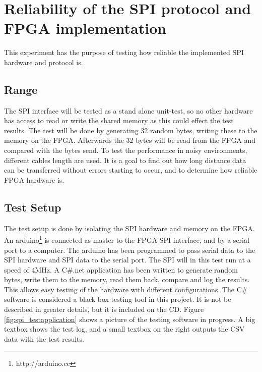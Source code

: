 \section{Reliability of the SPI protocol and FPGA implementation}
\label{sec:spi_rel_test}
This experiment has the purpose of testing how reliable the implemented SPI hardware and protocol is. 

\subsection{Range}	%
The SPI interface will be tested as a stand alone unit-test, so no other hardware has access to read or write the shared memory as this could effect the test results. The test will be done by generating 32 random bytes, writing these to the memory on the FPGA. Afterwards the 32 bytes will be read from the FPGA and compared with the bytes send. To test the performance in noisy environments, different cables length are used. It is a goal to find out how long distance data can be transferred without errors starting to occur, and to determine how reliable FPGA hardware is.


\subsection{Test Setup}
The test setup is done by isolating the SPI hardware and memory on the FPGA. An arduino\footnote{http://arduino.cc} is connected as master to the FPGA SPI interface, and by a serial port to a computer. The arduino has been programmed to pass serial data to the SPI hardware and SPI data to the serial port. The SPI will in this test run at a speed of 4MHz. A C\#.net application has been written to generate random bytes, write them to the memory, read them back, compare and log the results. This allows easy testing of the hardware with different configurations. The C\# software is considered a black box testing tool in this project. It is not be described in greater details, but it is included on the CD. Figure \ref{fig:spi_testapplication} shows a picture of the testing software in progress. A big textbox shows the test log, and a small textbox on the right outputs the CSV data with the test results.

